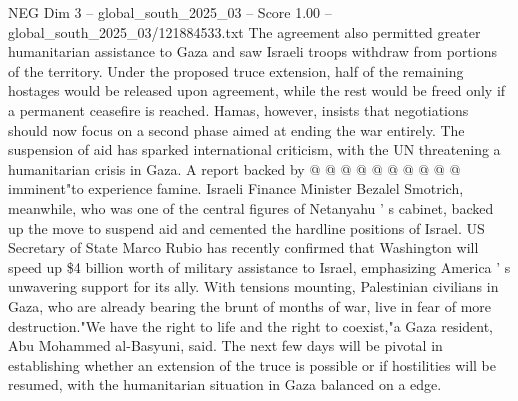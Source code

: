 \begin{textsample}{NEG Dim 3 – global\_south\_2025\_03 – Score 1.00 – global\_south\_2025\_03/121884533.txt}
The agreement also permitted greater humanitarian assistance to Gaza and saw Israeli troops withdraw from portions of the territory.
Under the proposed truce extension, half of the remaining hostages would be released upon agreement, while the rest would be freed only if a permanent ceasefire is reached.
Hamas, however, insists that negotiations should now focus on a second phase aimed at ending the war entirely.
The suspension of aid has sparked international criticism, with the UN threatening a humanitarian crisis in Gaza.
A report backed by @ @ @ @ @ @ @ @ @ @ imminent"to experience famine.
Israeli Finance Minister Bezalel Smotrich, meanwhile, who was one of the central figures of Netanyahu ' s cabinet, backed up the move to suspend aid and cemented the hardline positions of Israel.
US Secretary of State Marco Rubio has recently confirmed that Washington will speed up \$4 billion worth of military assistance to Israel, emphasizing America ' s unwavering support for its ally.
With tensions mounting, Palestinian civilians in Gaza, who are already bearing the brunt of months of war, live in fear of more destruction."We have the right to life and the right to coexist,"a Gaza resident, Abu Mohammed al-Basyuni, said.
The next few days will be pivotal in establishing whether an extension of the truce is possible or if hostilities will be resumed, with the humanitarian situation in Gaza balanced on a edge.

\end{textsample}
